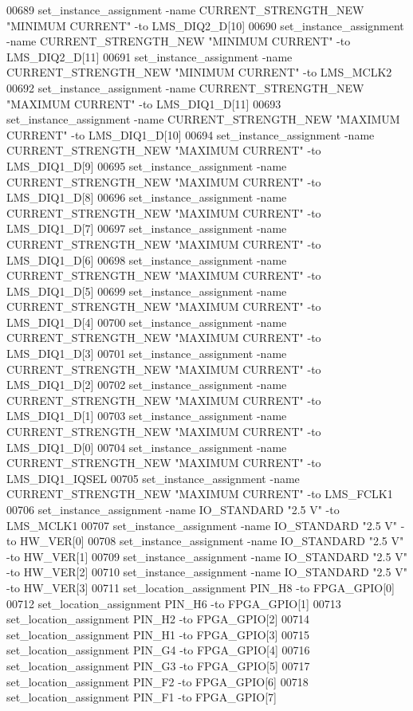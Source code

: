 \begin{DoxyCode}
00689 set\_instance\_assignment -name CURRENT\_STRENGTH\_NEW "MINIMUM CURRENT" -to LMS\_DIQ2\_D[10]
00690 set\_instance\_assignment -name CURRENT\_STRENGTH\_NEW "MINIMUM CURRENT" -to LMS\_DIQ2\_D[11]
00691 set\_instance\_assignment -name CURRENT\_STRENGTH\_NEW "MINIMUM CURRENT" -to LMS\_MCLK2
00692 set\_instance\_assignment -name CURRENT\_STRENGTH\_NEW "MAXIMUM CURRENT" -to LMS\_DIQ1\_D[11]
00693 set\_instance\_assignment -name CURRENT\_STRENGTH\_NEW "MAXIMUM CURRENT" -to LMS\_DIQ1\_D[10]
00694 set\_instance\_assignment -name CURRENT\_STRENGTH\_NEW "MAXIMUM CURRENT" -to LMS\_DIQ1\_D[9]
00695 set\_instance\_assignment -name CURRENT\_STRENGTH\_NEW "MAXIMUM CURRENT" -to LMS\_DIQ1\_D[8]
00696 set\_instance\_assignment -name CURRENT\_STRENGTH\_NEW "MAXIMUM CURRENT" -to LMS\_DIQ1\_D[7]
00697 set\_instance\_assignment -name CURRENT\_STRENGTH\_NEW "MAXIMUM CURRENT" -to LMS\_DIQ1\_D[6]
00698 set\_instance\_assignment -name CURRENT\_STRENGTH\_NEW "MAXIMUM CURRENT" -to LMS\_DIQ1\_D[5]
00699 set\_instance\_assignment -name CURRENT\_STRENGTH\_NEW "MAXIMUM CURRENT" -to LMS\_DIQ1\_D[4]
00700 set\_instance\_assignment -name CURRENT\_STRENGTH\_NEW "MAXIMUM CURRENT" -to LMS\_DIQ1\_D[3]
00701 set\_instance\_assignment -name CURRENT\_STRENGTH\_NEW "MAXIMUM CURRENT" -to LMS\_DIQ1\_D[2]
00702 set\_instance\_assignment -name CURRENT\_STRENGTH\_NEW "MAXIMUM CURRENT" -to LMS\_DIQ1\_D[1]
00703 set\_instance\_assignment -name CURRENT\_STRENGTH\_NEW "MAXIMUM CURRENT" -to LMS\_DIQ1\_D[0]
00704 set\_instance\_assignment -name CURRENT\_STRENGTH\_NEW "MAXIMUM CURRENT" -to LMS\_DIQ1\_IQSEL
00705 set\_instance\_assignment -name CURRENT\_STRENGTH\_NEW "MAXIMUM CURRENT" -to LMS\_FCLK1
00706 set\_instance\_assignment -name IO\_STANDARD "2.\textcolor{vhdllogic}{5} V" -to LMS\_MCLK1
00707 set\_instance\_assignment -name IO\_STANDARD "2.\textcolor{vhdllogic}{5} V" -to HW\_VER[0]
00708 set\_instance\_assignment -name IO\_STANDARD "2.\textcolor{vhdllogic}{5} V" -to HW\_VER[1]
00709 set\_instance\_assignment -name IO\_STANDARD "2.\textcolor{vhdllogic}{5} V" -to HW\_VER[2]
00710 set\_instance\_assignment -name IO\_STANDARD "2.\textcolor{vhdllogic}{5} V" -to HW\_VER[3]
00711 set\_location\_assignment PIN\_H8 -to FPGA\_GPIO[0]
00712 set\_location\_assignment PIN\_H6 -to FPGA\_GPIO[1]
00713 set\_location\_assignment PIN\_H2 -to FPGA\_GPIO[2]
00714 set\_location\_assignment PIN\_H1 -to FPGA\_GPIO[3]
00715 set\_location\_assignment PIN\_G4 -to FPGA\_GPIO[4]
00716 set\_location\_assignment PIN\_G3 -to FPGA\_GPIO[5]
00717 set\_location\_assignment PIN\_F2 -to FPGA\_GPIO[6]
00718 set\_location\_assignment PIN\_F1 -to FPGA\_GPIO[7]

\end{DoxyCode}
